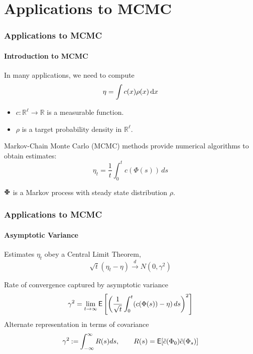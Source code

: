 \documentclass[xcolor=dvipsnames, subsection=false]{beamer}
\def\alertb#1{\alert{\color{BrickRed}  #1}}
\def\alertb#1{\alert{\color{BrickRed}  #1}}
\def\tilc{\tilde c}
\def\Expect{{\sf E}}
\def\bfmath#1{{\mathchoice{\mbox{\boldmath$#1$}}%
{\mbox{\boldmath$#1$}}%
{\mbox{\boldmath$\scriptstyle#1$}}%
{\mbox{\boldmath$\scriptscriptstyle#1$}}}}
\def\bfPhi{\bfmath{\Phi}}
\newcommand{\field}[1]{\mathbb{#1}}
\def\Re{\field{R}}
\def\eqdef{\mathbin{:=}}
\def\rmd{\,\textmd{d}}
\def\markovstate{\Phi}
\newcommand{\pr}{\rho}
\def\Expect{{\sf E}}
\begin{document}
\begin{frame}
\begin{minipage}[t][6.5cm][t]{\textwidth}
\end{minipage}
\end{frame}

\section{Applications to MCMC}
\begin{frame}
\frametitle{Applications to MCMC}
\framesubtitle{Introduction to MCMC}
In many applications, we need to compute
\begin{equation*}
\eta = \int c(x)\pr(x) \rmd x
\label{e:eta}
\end{equation*}
\begin{itemize}
	\item $c\colon\Re^\ell\to\Re$ is a measurable function.
	\item $\pr$ is a target probability density in $\Re^\ell$.
\end{itemize}
 Markov-Chain Monte Carlo (MCMC) methods provide numerical algorithms to obtain estimates:
	\[
	\eta_t =\frac{1}{t}\int_0^t c(\markovstate(s)) \, ds
	\label{e:sample_mean}
	\]
\begin{center}
	$\bfPhi$ is a Markov process with steady state distribution $\pr$.
\end{center}
\end{frame}

\begin{frame}
\frametitle{Applications to MCMC}
\framesubtitle{Asymptotic Variance}
Estimates $\eta_t$ obey a Central Limit Theorem,
\[
\sqrt{t} (\eta_t - \eta) \xrightarrow[]{d} N(0,\gamma^2)
\]

Rate of convergence captured by \alertb{asymptotic variance}
\[
\gamma^2 = \lim_{t \to \infty} \Expect \left[\left(\frac{1}{\sqrt{t}}\int_{0}^{t}(c(\markovstate(s))-\eta)\,ds\right)^2\right]
\]
Alternate representation in terms of covariance
\[
\gamma^2  \eqdef \int_{-\infty}^\infty R(s) ds, \qquad R(s) = \Expect [\tilc(\Phi_0) \tilc(\Phi_s)]
\]
\normalsize
\end{frame}
\end{document}
